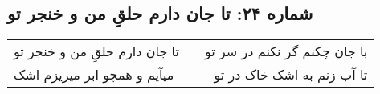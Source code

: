 \begin{center}
\section*{شماره ۲۴: تا جان دارم حلقِ من و خنجر تو}
\label{sec:024}
\begin{longtable}{l p{0.5cm} r}
تا جان دارم حلقِ من و خنجر تو
&&
با جان چکنم گر نکنم در سر تو
\\
میآیم و همچو ابر میریزم اشک
&&
تا آب زنم به اشک خاک در تو
\\
\end{longtable}
\end{center}
